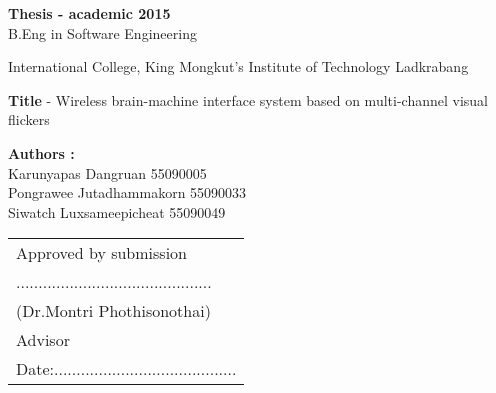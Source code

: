 \begin{approve}
\textbf{Thesis - academic 2015}\\
B.Eng in Software Engineering

International College, King Mongkut's Institute of Technology Ladkrabang


\textbf{Title} - Wireless brain-machine interface system based on multi-channel visual flickers

\textbf{Authors :}\\
Karunyapas  Dangruan  55090005\\
Pongrawee  Jutadhammakorn 55090033\\
Siwatch  Luxsameepicheat  55090049\\

\begin{flushright}
\begin{tabu}{P}
	
	Approved by submission\\
	............................................\\
	(Dr.Montri Phothisonothai)\\
	Advisor\\
	
	Date:.........................................\\
\end{tabu}   
\end{flushright}




\end{approve}